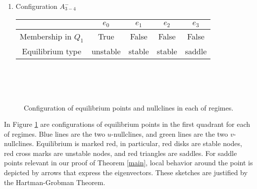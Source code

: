 \documentclass{amsart}
\theoremstyle{definition}
\numberwithin{equation}{section}
\begin{document}
\begin{enumerate}
 \item Configuration $A_{3-4}^-$

 \medskip
 \begin{tabular}[hc]{|c|c|c|c|c|}
\hline
& $e_0$ & $e_1$ & $e_2$ & $e_3$ \\
\hline
Membership in $Q_1$ & True & False & False & False\\
\hline
Equilibrium type & unstable & stable & stable & saddle \\
\hline
\end{tabular}
\medskip
\end{enumerate}

\begin{figure}
     
       
   \\ 
   \\ 
  \\ 
 \caption{Configuration of equilibrium points and nullclines in each of regimes.}\label{config} 
\end{figure}
In Figure \ref{config} are configurations of equilibrium points in the first quadrant for each of regimes. Blue lines are the two $u$-nullclines, and green lines are the two $v$-nullclines. Equilibrium is marked red, in particular, red disks are  stable nodes, red cross marks are unstable nodes, and red triangles are saddles. For saddle points relevant in our proof of Theorem \ref{main}, local behavior around the point is depicted by arrows that express the eigenvectors. These sketches are justified by the Hartman-Grobman Theorem.
\end{document}
